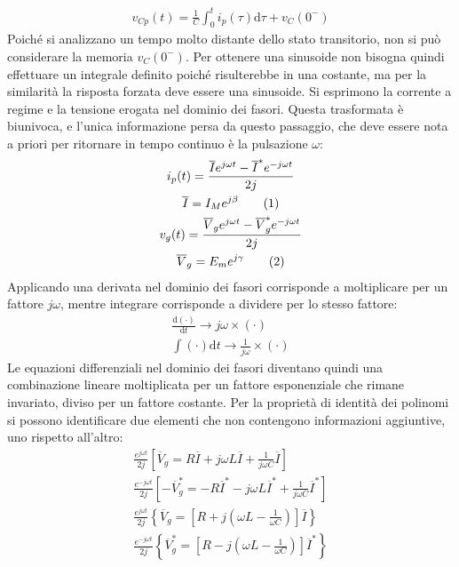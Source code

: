 \documentclass{article}
\newcommand{\df}{\mathrm{d}}
\newcommand{\tageq}{\tag{\stepcounter{equation}\theequation}}
\numberwithin{equation}{subsection}
\begin{document}
\begin{gather*}
    v_{Cp}(t)=\displaystyle\frac{1}{C}\int_{0}^{t}i_p(\tau)\df\tau+v_C(0^-)
\end{gather*}
Poiché si analizzano un tempo molto distante dello stato transitorio, non si può considerare la memoria $v_C(0^-)$. Per ottenere una sinusoide non bisogna quindi effettuare 
un integrale definito poiché risulterebbe in una costante, ma per la similarità la risposta forzata deve essere una sinusoide. 
Si esprimono la corrente a regime e la tensione erogata nel dominio dei fasori. Questa trasformata è biunivoca, e l'unica informazione persa da questo passaggio, che deve 
essere nota a priori per ritornare in tempo continuo è la pulsazione $\omega$:
\begin{gather*}
    i_p(t)=\displaystyle\frac{\overline{I}e^{j\omega t}-\overline{I}^*e^{-j\omega t}}{2j}\\
    \overline{I}=I_Me^{j\beta}\tageq\\
    v_{g}(t)=\displaystyle\frac{\overline{V}_ge^{j\omega t}-\overline{V}_g^*e^{-j\omega t}}{2j}\\
    \overline{V}_g=E_me^{j\gamma}\tageq
\end{gather*}
Applicando una derivata nel dominio dei fasori corrisponde a moltiplicare per un fattore $j\omega$, mentre integrare corrisponde a dividere per lo stesso 
fattore:
\begin{gather*}
    \displaystyle\frac{\df(\cdot)}{\df t}\to j\omega\times(\cdot)\\
    \displaystyle\int (\cdot)\df t\to\displaystyle\frac{1}{j\omega}\times(\cdot)
\end{gather*}
Le equazioni differenziali nel dominio dei fasori diventano quindi una combinazione lineare moltiplicata per un fattore esponenziale che rimane invariato, diviso per un 
fattore costante. Per la proprietà di identità dei polinomi si possono identificare due elementi che non contengono informazioni aggiuntive, uno rispetto all'altro: 
\begin{gather*}
    \displaystyle\frac{e^{j\omega t}}{2j}\left[\overline{V}_g=R\overline{I}+j\omega L\overline{I}+\frac{1}{j\omega C}\overline{I}\right]\\
    \displaystyle\frac{e^{-j\omega t}}{2j}\left[-\overline{V}_g^*=-R\overline{I}^*-j\omega L\overline{I}^*+\frac{1}{j\omega C}\overline{I}^*\right]\\
    \displaystyle\frac{e^{j\omega t}}{2j}\left\{\overline{V}_g=\left[R+j\left(\omega L-\frac{1}{\omega C}\right)\right]\overline{I}\right\}\\
    \displaystyle\frac{e^{-j\omega t}}{2j}\left\{\overline{V}_g^*=\left[R-j\left(\omega L-\frac{1}{\omega C}\right)\right]\overline{I}^*\right\}
\end{gather*}
\end{document}
